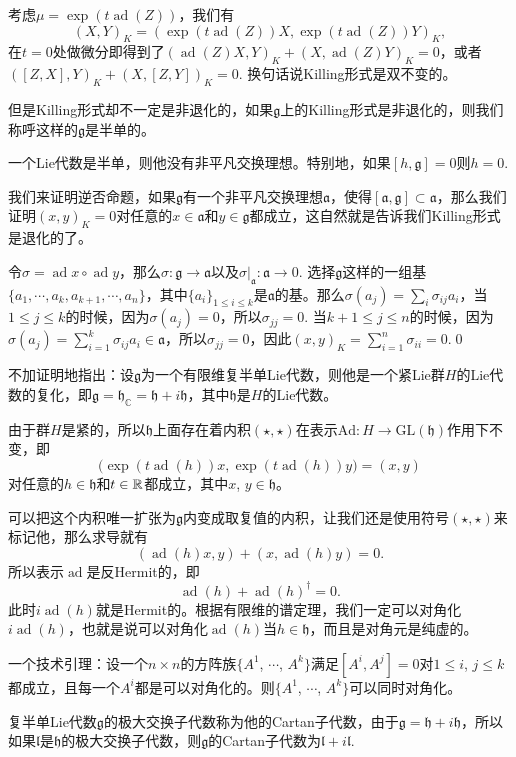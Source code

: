 \documentclass[9pt]{extarticle}
\newcommand{\cc}{\mathbb{C}}
\newcommand{\lag}{{\mathfrak{g}}}
\DeclareMathOperator{\ad}{ad}
\begin{document}
考虑$\mu=\exp(t\ad(Z))$，我们有
\[
	(X,Y)_K=(\exp(t\ad(Z))X,\exp(t\ad(Z))Y)_K,
\]
在$t=0$处做微分即得到了$(\ad(Z)X,Y)_K+(X,\ad(Z)Y)_K=0$，或者$([Z,X],Y)_K+(X,[Z,Y])_K=0$. 换句话说Killing形式是双不变的。

但是Killing形式却不一定是非退化的，如果$\lag$上的Killing形式是非退化的，则我们称呼这样的$\lag$是半单的。

\pro 一个Lie代数是半单，则他没有非平凡交换理想。特别地，如果$[h,\lag]=0$则$h=0$.

\proof 我们来证明逆否命题，如果$\lag$有一个非平凡交换理想$\mathfrak{a}$，使得$[\mathfrak{a},\lag]\subset \mathfrak{a}$，那么我们证明$(x,y)_K=0$对任意的$x\in \mathfrak{a}$和$y\in \lag$都成立，这自然就是告诉我们Killing形式是退化的了。

令$\sigma=\ad x\circ \ad y$，那么$\sigma:\lag\to \mathfrak{a}$以及$\sigma|_\mathfrak{a}:\mathfrak{a}\to 0$. 选择$\lag$这样的一组基$\{a_1,\cdots,a_k,a_{k+1},\cdots,a_{n}\}$，其中$\{a_i\}_{1\leq i \leq k}$是$\mathfrak{a}$的基。那么$\sigma(a_j)=\sum_i\sigma_{ij} a_i$，当$1\leq j\leq k$的时候，因为$\sigma(a_j)=0$，所以$\sigma_{jj}=0$. 当$k+1\leq j \leq n$的时候，因为$\sigma(a_j)=\sum_{i=1}^k\sigma_{ij} a_i\in\mathfrak{a}$，所以$\sigma_{jj}=0$，因此$(x,y)_K=\sum_{i=1}^n\sigma_{ii}=0$.\qed

\theo 不加证明地指出：设$\lag$为一个有限维复半单Lie代数，则他是一个紧Lie群$H$的Lie代数的复化，即$\lag=\mathfrak{h}_{\cc}=\mathfrak{h}+i\mathfrak{h}$，其中$\mathfrak{h}$是$H$的Lie代数。

由于群$H$是紧的，所以$\mathfrak{h}$上面存在着内积$(\star,\star)$在表示$\mathrm{Ad}:H\to \mathrm{GL}(\mathfrak{h})$作用下不变，即
\[
	\bigl(\exp(t\ad(h))x,\exp(t\ad(h))y\bigr)=(x,y)
\]
对任意的$h\in\mathfrak{h}$和$t\in \mathbb{R}$都成立，其中$x$, $y\in\mathfrak{h}$。

可以把这个内积唯一扩张为$\lag$内变成取复值的内积，让我们还是使用符号$(\star,\star)$来标记他，那么求导就有
\[
	(\ad(h)x,y)+(x,\ad(h)y)=0.
\]
所以表示$\ad$是反Hermit的，即
\[
	\ad(h)+\ad(h)^\dag=0.
\]
此时$i\ad(h)$就是Hermit的。根据有限维的谱定理，我们一定可以对角化$i\ad(h)$，也就是说可以对角化$\ad(h)$当$h\in \mathfrak{h}$，而且是对角元是纯虚的。

\lem 一个技术引理：设一个$n\times n$的方阵族$\{A^1$, $\cdots$, $A^k\}$满足$[A^i,A^j]=0$对$1\leq i$, $j\leq k$都成立，且每一个$A^i$都是可以对角化的。则$\{A^1$, $\cdots$, $A^k\}$可以同时对角化。

\para 复半单Lie代数$\lag$的极大交换子代数称为他的Cartan子代数，由于$\lag=\mathfrak{h}+i\mathfrak{h}$，所以如果$\mathfrak{l}$是$\mathfrak{h}$的极大交换子代数，则$\lag$的Cartan子代数为$\mathfrak{l}+i\mathfrak{l}$.
\end{document}
